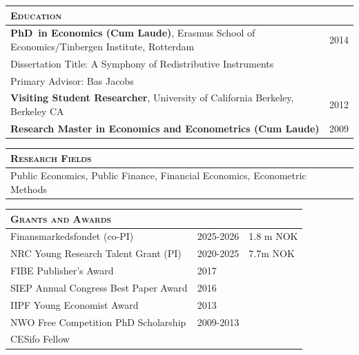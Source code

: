 \documentclass [11pt]{article}
\newcommand{\kiss}
{\vspace{0.5cm}}
\newcommand{\first} 
{13.8}
\newcommand{\second}
{2.5}
\newcommand{\thickrule}{\toprule}
\newcommand{\ttitle}[1]{\scshape{\Large {#1}}}
\begin{document}
\kiss

\begin{tabular}[t] {p{\first cm} p{\second cm} }
\ttitle{Education} &
\\
\toprule
\textbf{PhD\ in Economics (Cum Laude)}, Erasmus School of Economics/Tinbergen Institute, Rotterdam & 2014
\\
Dissertation Title: A Symphony of Redistributive Instruments &
\\
\vspace{-0.4cm}
Primary Advisor: Bas Jacobs &
\\
\textbf{Visiting Student Researcher}, University of California Berkeley, Berkeley CA & 2012
\\
\textbf{Research Master in Economics and Econometrics (Cum Laude)}
			 & 2009\\
\end{tabular}



\kiss

\begin{tabular}[t] {p{\first cm} p{\second cm} }
\ttitle{Research Fields} &
\\
\thickrule
Public Economics, Public Finance, Financial Economics, Econometric Methods
\end{tabular}

\kiss

\begin{tabular}[t] {p{\first cm} p{\second cm} p{\second cm}}
\ttitle{Grants and Awards}&
\\
\thickrule
Finansmarkedsfondet (co-PI) & 2025-2026  & 1.8 m NOK\\ 
NRC Young Research Talent Grant (PI)  & 2020-2025 & 7.7m NOK\\ 
FIBE Publisher's Award & 2017 &\\
SIEP Annual Congress Best Paper Award & 2016 &\\
IIPF Young Economist Award & 2013 &\\
NWO Free Competition PhD Scholarship &	2009-2013 &\\
CESifo Fellow &  & 
\end{tabular}

\kiss
\end{document}
